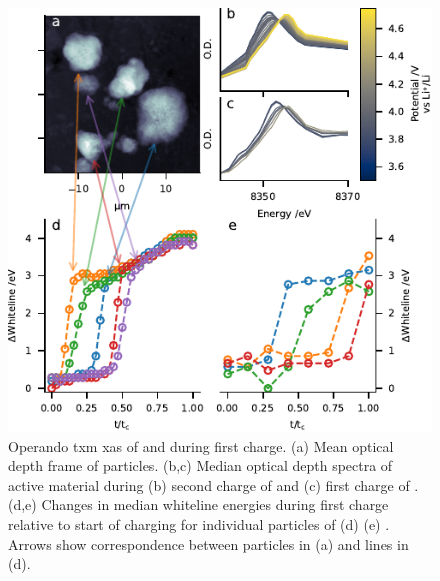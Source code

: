 \documentclass{article}
\begin{document}
\begin{figure}[!h]
  \includegraphics{figures/nmc_txm.pdf}
  \caption{Operando \gls{txm} \gls{xas} of \nmc[333]{} and \nmc[532]{}
    during first charge. (a) Mean optical depth frame of \nmc[333]{}
    particles. (b,c) Median optical depth spectra of active material
    during (b) second charge of \nmc[333]{} and (c) first charge of
    \nmc[532]{}. (d,e) Changes in median whiteline energies during
    first charge relative to start of charging for individual
    particles of (d) \nmc[333]{} (e) \nmc[532]{}. Arrows show
    correspondence between particles in (a) and lines in (d).}
  \label{fig:txm-nmc}
\end{figure}
\end{document}
